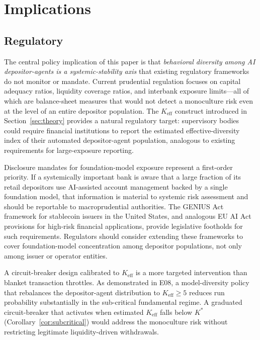 \section{Implications}
\label{sec:implications}

\subsection{Regulatory}

The central policy implication of this paper is that \emph{behavioral diversity among AI depositor-agents is a systemic-stability axis} that existing regulatory frameworks do not monitor or mandate. Current prudential regulation focuses on capital adequacy ratios, liquidity coverage ratios, and interbank exposure limits---all of which are balance-sheet measures that would not detect a monoculture risk even at the level of an entire depositor population. The $K_{\text{eff}}$ construct introduced in Section~\ref{sec:theory} provides a natural regulatory target: supervisory bodies could require financial institutions to report the estimated effective-diversity index of their automated depositor-agent population, analogous to existing requirements for large-exposure reporting.

Disclosure mandates for foundation-model exposure represent a first-order priority. If a systemically important bank is aware that a large fraction of its retail depositors use AI-assisted account management backed by a single foundation model, that information is material to systemic risk assessment and should be reportable to macroprudential authorities. The GENIUS Act framework for stablecoin issuers in the United States, and analogous EU AI Act provisions for high-risk financial applications, provide legislative footholds for such requirements. Regulators should consider extending these frameworks to cover foundation-model concentration among depositor populations, not only among issuer or operator entities.

A circuit-breaker design calibrated to $K_{\text{eff}}$ is a more targeted intervention than blanket transaction throttles. As demonstrated in E08, a model-diversity policy that rebalances the depositor-agent distribution to $K_{\text{eff}} \geq 5$ reduces run probability substantially in the sub-critical fundamental regime. A graduated circuit-breaker that activates when estimated $K_{\text{eff}}$ falls below $K^*$ (Corollary~\ref{cor:subcritical}) would address the monoculture risk without restricting legitimate liquidity-driven withdrawals.

